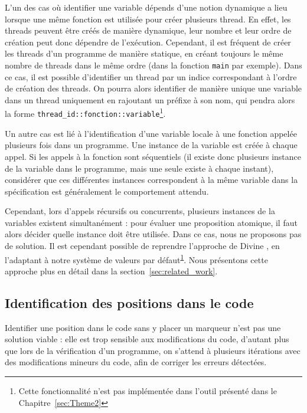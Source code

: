 L'un des cas où identifier une variable dépends d'une notion dynamique a lieu
lorsque une même fonction est utilisée pour créer plusieurs thread. En effet,
les threads peuvent être créés de manière dynamique, leur nombre et leur ordre
de création peut donc dépendre de l'exécution. Cependant, il est fréquent de
créer les threads d'un programme de manière statique, en créant toujours le même
nombre de threads dans le même ordre (dans la fonction \texttt{main} par
exemple). Dans ce cas, il est possible d'identifier un thread par un indice
correspondant à l'ordre de création des threads. On pourra alors identifier de
manière unique une variable dans un thread uniquement en rajoutant un préfixe à
son nom, qui pendra alors la forme
\texttt{{thread\_id}::{fonction}::{variable}}\footnote{\label{fn:notimplemented}
Cette fonctionnalité n'est pas implémentée dans l'outil présenté dans le
Chapitre~\ref{sec:Theme2}}.

Un autre cas est lié à l'identification d'une variable locale à une fonction
appelée plusieurs fois dans un programme. Une instance de la variable est créée
à chaque appel. Si les appels à la fonction sont séquentiels (il
existe donc plusieurs instance de la variable dans le programme, mais une seule
existe à chaque instant), considérer que ces différentes instances correspondent
à la même variable dans la spécification est généralement le comportement
attendu.

Cependant, lors d'appels récursifs ou concurrents, plusieurs instances de la
variables existent simultanément : pour évaluer une proposition atomique, il
faut alors décider quelle instance doit être utilisée. Dans ce cas, nous ne
proposons pas de solution. Il est cependant possible de reprendre l'approche de
Divine \cite{Divine_LTL}, en l'adaptant à notre système de valeurs par
défaut\textsuperscript{\ref{fn:notimplemented}}. Nous présentons cette approche
plus en détail dans la section~\ref{sec:related_work}.

\subsection{Identification des positions dans le code}

Identifier une position dans le code sans y placer un marqueur n'est pas une
solution viable : elle est trop sensible aux modifications du code, d'autant
plus que lors de la vérification d'un programme, on s'attend à plusieurs
itérations avec des modifications mineurs du code, afin de corriger les erreurs
détectées.

